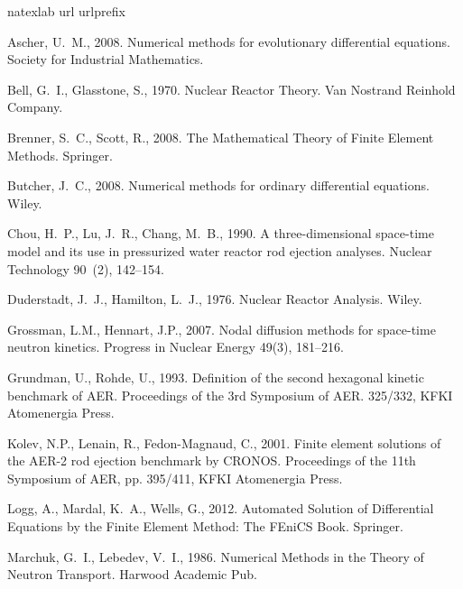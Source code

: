 \documentclass{aip-cp}
\begin{document}
\begin{thebibliography}{35}
\expandafter\ifx\csname natexlab\endcsname\relax\def\natexlab#1{#1}\fi
\expandafter\ifx\csname url\endcsname\relax
  \def\url#1{\texttt{#1}}\fi
\expandafter\ifx\csname urlprefix\endcsname\relax\def\urlprefix{URL }\fi

Ascher, U.~M., 2008. Numerical methods for evolutionary differential equations.
  Society for Industrial Mathematics.

Bell, G.~I., Glasstone, S., 1970. Nuclear Reactor Theory. Van Nostrand Reinhold
  Company.

Brenner, S.~C., Scott, R., 2008. The Mathematical Theory of Finite Element
  Methods. Springer.

Butcher, J.~C., 2008. {Numerical methods for ordinary differential equations}.
  Wiley.

Chou, H.~P., Lu, J.~R., Chang, M.~B., 1990. A three-dimensional space-time
  model and its use in pressurized water reactor rod ejection analyses. Nuclear
  Technology 90~(2), 142--154.

Duderstadt, J.~J., Hamilton, L.~J., 1976. Nuclear Reactor Analysis. Wiley.

Grossman, L.M., Hennart, J.P., 2007. Nodal diffusion methods for space-time neutron
  kinetics. Progress in Nuclear Energy  49(3),  181--216.
  
Grundman, U., Rohde, U., 1993. Definition of the second hexagonal kinetic benchmark of AER. Proceedings of the 3rd Symposium of AER. 325/332, KFKI Atomenergia Press.

Kolev, N.P., Lenain, R., Fedon-Magnaud, C., 2001. Finite element solutions of the AER-2 rod ejection benchmark by CRONOS. Proceedings of the 11th Symposium of AER, pp. 395/411, KFKI Atomenergia Press.

Logg, A., Mardal, K.~A., Wells, G., 2012. Automated Solution of Differential
  Equations by the Finite Element Method: The FEniCS Book. Springer.

Marchuk, G.~I., Lebedev, V.~I., 1986. Numerical Methods in the Theory of
  Neutron Transport. Harwood Academic Pub.


\end{thebibliography}
\end{document}
